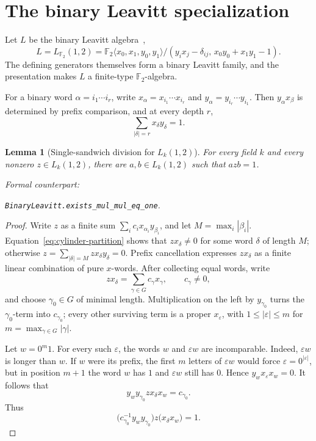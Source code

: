 \documentclass[11pt]{amsart}
\newif\ifanonymous\anonymoustrue
\newcommand{\leanrepo}{[repository link removed for anonymous review]}
\newcommand{\leanrepo}{https://github.com/SauersML/group-approximation}
\newcommand{\leanverified}[2]{%
  \par\smallskip\noindent
  {\normalfont\footnotesize\color{gray!70!black}%
  Formal counterpart:\par\nobreak\noindent
  \ifanonymous\nolinkurl{#2}\else
  \href{\leanrepo/blob/main/GroupApproximation/#1.lean}{\nolinkurl{#2}}\fi.}}
\newtheorem{lemma}[theorem]{Lemma}
\theoremstyle{definition}
\theoremstyle{plain}
\newcommand{\F}{\mathbb F}
\newcommand{\abs}[1]{\left\lvert#1\right\rvert}
\begin{document}
\section{The binary Leavitt specialization}\label{sec:leavitt}

Let \(L\) be the binary Leavitt algebra~\cite{Leavitt},
\[
  L=L_{\F_2}(1,2)
  =\F_2\langle x_0,x_1,y_0,y_1\rangle/
  (y_i x_j-\delta_{ij},\,x_0y_0+x_1y_1-1).
\]
The defining generators themselves form a binary Leavitt family,
and the presentation makes \(L\) a finite-type \(\F_2\)-algebra.

For a binary word \(\alpha=i_1\cdots i_r\), write
\(x_\alpha=x_{i_1}\cdots x_{i_r}\) and
\(y_\alpha=y_{i_r}\cdots y_{i_1}\).  Then
\(y_\alpha x_\beta\) is determined by prefix comparison, and at every
depth \(r\),
\begin{equation}\label{eq:cylinder-partition}
 \sum_{\abs\delta=r}x_\delta y_\delta=1.
\end{equation}

\begin{lemma}[Single-sandwich division for \(L_k(1,2)\)]
\label{lem:leavitt-sandwich}
For every field \(k\) and every nonzero \(z\in L_k(1,2)\), there are
\(a,b\in L_k(1,2)\) such that \(azb=1\).
\leanverified{Leavitt/LeavittSimplicity}{BinaryLeavitt.exists_mul_mul_eq_one}
\end{lemma}

\begin{proof}
Write \(z\) as a finite sum
\(\sum_i c_i x_{\alpha_i}y_{\beta_i}\), and let
\(M=\max_i\abs{\beta_i}\).  Equation~\eqref{eq:cylinder-partition}
shows that \(zx_\delta\ne0\) for some word \(\delta\) of length
\(M\); otherwise
\(z=\sum_{\abs\delta=M}zx_\delta y_\delta=0\).
Prefix cancellation expresses \(zx_\delta\) as a finite linear
combination of pure \(x\)-words.  After collecting equal words, write
\[
 zx_\delta=\sum_{\gamma\in G}c_\gamma x_\gamma,
 \qquad c_\gamma\ne0,
\]
and choose \(\gamma_0\in G\) of minimal length.  Multiplication on the
left by \(y_{\gamma_0}\) turns the \(\gamma_0\)-term into
\(c_{\gamma_0}\); every other surviving term is a proper
\(x_\varepsilon\), with \(1\le\abs\varepsilon\le m\) for
\(m=\max_{\gamma\in G}\abs\gamma\).

Let \(w=0^m1\).  For every such \(\varepsilon\), the words \(w\)
and \(\varepsilon w\) are incomparable.  Indeed,
\(\varepsilon w\) is longer than \(w\).  If \(w\) were its prefix,
the first \(m\) letters of \(\varepsilon w\) would force
\(\varepsilon=0^{\lvert\varepsilon\rvert}\), but in position \(m+1\)
the word \(w\) has \(1\) and \(\varepsilon w\) still has \(0\).
Hence
\(y_w{}x_\varepsilon x_w=0\).  It follows that
\[
 y_w{}y_{\gamma_0}zx_\delta x_w=c_{\gamma_0}.
\]
Thus
\[
 \bigl(c_{\gamma_0}^{-1}y_w{}y_{\gamma_0}\bigr)
 z\bigl(x_\delta x_w\bigr)=1.
\]
\end{proof}
\end{document}
